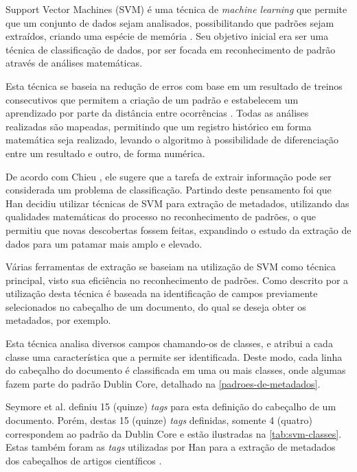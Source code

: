 \begin{textonovo}
Support Vector Machines (SVM) é uma técnica de \textit{machine learning} que permite que um conjunto de dados sejam analisados, possibilitando que padrões sejam extraídos, criando uma espécie de memória \cite{Vapnik-SVM}. Seu objetivo inicial era ser uma técnica de classificação de dados, por ser focada em reconhecimento de padrão através de análises matemáticas.

Esta técnica se baseia na redução de erros com base em um resultado de treinos consecutivos que permitem a criação de um padrão e estabelecem um aprendizado por parte da distância entre ocorrências \cite{Vapnik-SVM}. Todas as análises realizadas são mapeadas, permitindo que um registro histórico em forma matemática seja realizado, levando o algoritmo à possibilidade de diferenciação entre um resultado e outro, de forma numérica.

De acordo com Chieu \cite{Chieu}, ele sugere que a tarefa de extrair informação pode ser considerada um problema de classificação. Partindo deste pensamento foi que Han \cite{Han-SVM} decidiu utilizar técnicas de SVM para extração de metadados, utilizando das qualidades matemáticas do processo no reconhecimento de padrões, o que permitiu que novas descobertas fossem feitas, expandindo o estudo da extração de dados para um patamar mais amplo e elevado.

\end{textonovo}

\begin{textoalterado}
Várias ferramentas de extração se baseiam na utilização de SVM como técnica principal, visto sua eficiência no reconhecimento de padrões. Como descrito por \cite{Han-SVM} a utilização desta técnica é baseada na identificação de campos previamente selecionados no cabeçalho de um documento, do qual se deseja obter os metadados, por exemplo.

Esta técnica analisa diversos campos chamando-os de classes, e atribui a cada classe uma característica que a permite ser identificada. Deste modo, cada linha do cabeçalho do documento é classificada em uma ou mais classes, onde algumas fazem parte do padrão Dublin Core, detalhado na \autoref{padroes-de-metadados}.

Seymore et al. \cite{Seymore-HMM-IE} definiu 15 (quinze) \textit{tags} para esta definição do cabeçalho de um documento. Porém, destas 15 (quinze) \textit{tags} definidas, somente 4 (quatro) correspondem ao padrão da Dublin Core e estão ilustradas na \autoref{tab:svm-classes}. Estas também foram as \textit{tags} utilizadas por Han para a extração de metadados dos cabeçalhos de artigos científicos \cite{Han-SVM}.

\end{textoalterado}

